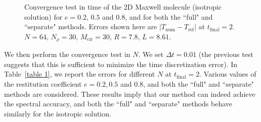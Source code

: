 \documentclass[review, times]{elsarticle}
\begin{document}
\begin{figure}[htp!]
  \caption{Convergence test in time of the 2D Maxwell molecule (isotropic solution) for $e=0.2$, $0.5$ and $0.8$, and for both the ``full" and ``separate" methods. Errors shown here are $|T_\text{num} - T_\text{ref}|$ at $t_\text{final}=2$. $N=64$, $N_{\rho}=30$, $M_{\text{cir}}=30$, $R=7.8$, $L=8.61$.}
  \label{dt_conv_1}
\end{figure}

We then perform the convergence test in $N$. We set $\Delta t = 0.01$ (the previous test suggests that this is sufficient to minimize the time discretization error). In Table~\ref{table 1}, we report the errors for different $N$ at $t_\text{final}=2$. Various values of the restitution coefficient $e = 0.2, 0.5$ and $0.8$, and both the ``full" and ``separate" methods are considered. These results imply that our method can indeed achieve the spectral accuracy, and both the ``full" and ``separate" methods behave similarly for the isotropic solution.
\end{document}
